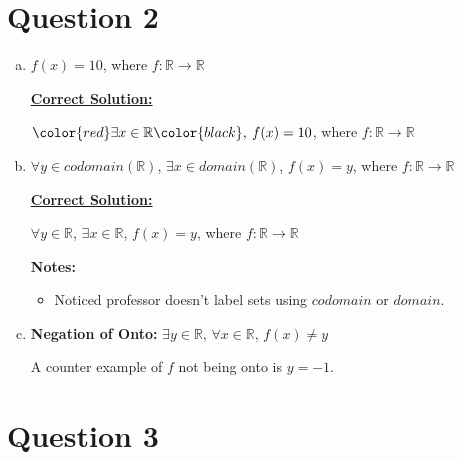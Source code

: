 \documentclass[12pt]{article}
\begin{document}
\section*{Question 2}
\begin{enumerate}[a.]
    \item

    $f(x) = 10$, where $f:\mathbb{R} \to \mathbb{R}$

    \bigskip

    \begin{mdframed}
        \underline{\textbf{Correct Solution:}}

        \bigskip

        $\color{red}\exists x \in \mathbb{R}\color{black},\:f(x) = 10$, where $f:\mathbb{R} \to \mathbb{R}$

    \end{mdframed}

    \item

    $\forall y \in codomain(\mathbb{R})$, $\exists x \in domain(\mathbb{R})$, $f(x) = y$, where $f:\mathbb{R} \to \mathbb{R}$

    \bigskip

    \begin{mdframed}
        \underline{\textbf{Correct Solution:}}

        \bigskip

        \color{red}$\forall y \in \mathbb{R}$, $\exists x \in \mathbb{R}$\color{black}, $f(x) = y$, where $f:\mathbb{R} \to \mathbb{R}$

    \end{mdframed}

    \bigskip

    \textbf{Notes:}

    \begin{itemize}
        \item Noticed professor doesn't label sets using $codomain$ or $domain$.
    \end{itemize}

    \item

    \textbf{Negation of Onto:} $\exists y \in \mathbb{R}$, $\forall x \in \mathbb{R}$, $f(x) \neq y$

    \bigskip

    A counter example of $f$ not being onto is $y = -1$.

\end{enumerate}

\section*{Question 3}
\end{document}
